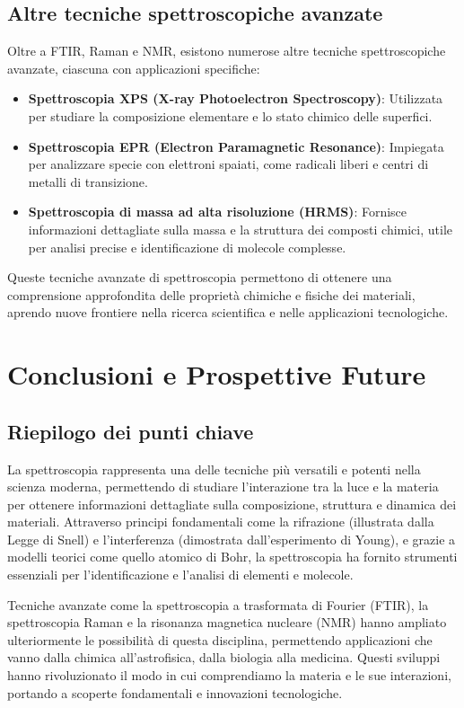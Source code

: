 \documentclass[12pt,a4paper]{report}
\begin{document}
\subsection{Altre tecniche spettroscopiche avanzate}

Oltre a FTIR, Raman e NMR, esistono numerose altre tecniche spettroscopiche avanzate, ciascuna con applicazioni specifiche:

\begin{itemize}
\item \textbf{Spettroscopia XPS (X-ray Photoelectron Spectroscopy)}: Utilizzata per studiare la composizione elementare e lo stato chimico delle superfici.
\item \textbf{Spettroscopia EPR (Electron Paramagnetic Resonance)}: Impiegata per analizzare specie con elettroni spaiati, come radicali liberi e centri di metalli di transizione.
\item \textbf{Spettroscopia di massa ad alta risoluzione (HRMS)}: Fornisce informazioni dettagliate sulla massa e la struttura dei composti chimici, utile per analisi precise e identificazione di molecole complesse.
\end{itemize}

Queste tecniche avanzate di spettroscopia permettono di ottenere una comprensione approfondita delle proprietà chimiche e fisiche dei materiali, aprendo nuove frontiere nella ricerca scientifica e nelle applicazioni tecnologiche.

\section{Conclusioni e Prospettive Future}

\subsection{Riepilogo dei punti chiave}

La spettroscopia rappresenta una delle tecniche più versatili e potenti nella scienza moderna, permettendo di studiare l'interazione tra la luce e la materia per ottenere informazioni dettagliate sulla composizione, struttura e dinamica dei materiali. Attraverso principi fondamentali come la rifrazione (illustrata dalla Legge di Snell) e l'interferenza (dimostrata dall'esperimento di Young), e grazie a modelli teorici come quello atomico di Bohr, la spettroscopia ha fornito strumenti essenziali per l'identificazione e l'analisi di elementi e molecole.

Tecniche avanzate come la spettroscopia a trasformata di Fourier (FTIR), la spettroscopia Raman e la risonanza magnetica nucleare (NMR) hanno ampliato ulteriormente le possibilità di questa disciplina, permettendo applicazioni che vanno dalla chimica all'astrofisica, dalla biologia alla medicina. Questi sviluppi hanno rivoluzionato il modo in cui comprendiamo la materia e le sue interazioni, portando a scoperte fondamentali e innovazioni tecnologiche.
\end{document}
